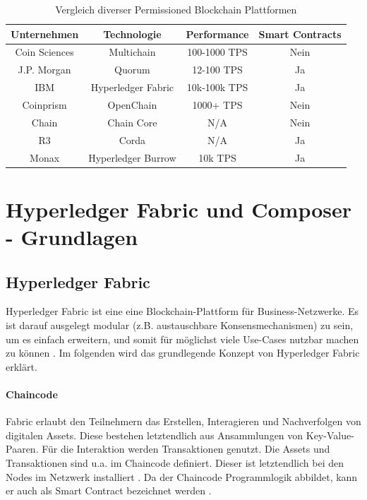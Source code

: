 \begin{table}[h]
    \centering
	\begin{tabular}{c c c c}
	\textbf{Unternehmen} & \textbf{Technologie}  & \textbf{Performance} & \textbf{Smart Contracts} \\ \hline
	Coin Sciences & Multichain & 100-1000 TPS & Nein \\ \hline
    J.P. Morgan & Quorum & 12-100 TPS & Ja \\ \hline
    IBM & Hyperledger Fabric & 10k-100k TPS & Ja \\ \hline
    Coinprism & OpenChain & 1000+ TPS & Nein \\ \hline
    Chain & Chain Core & N/A & Nein \\ \hline
    R3 & Corda & N/A & Ja \\ \hline
    Monax & Hyperledger Burrow & 10k TPS & Ja \\
    \end{tabular}
    \caption{Vergleich diverser Permissioned Blockchain Plattformen \cite{BenHamidaBlockchainEnterpriseOverview2017}\cite{HyperledgerBurrowTeamHyperledgerBurrowGitHub2018}}
	\label{tab:perm-comparison}
\end{table}


\section{Hyperledger Fabric und Composer - Grundlagen}
\label{sec:hyperledger-fabric-composer}


\subsection{Hyperledger Fabric}
Hyperledger Fabric ist eine eine Blockchain-Plattform für Business-Netzwerke. Es ist darauf ausgelegt modular (z.B. austauschbare Konsensmechanismen) zu sein, um es einfach erweitern, und somit für möglichst viele Use-Cases nutzbar machen zu können \cite{HyperledgerFabricTeamHyperledgerWhitepaper2016}. Im folgenden wird das grundlegende Konzept von Hyperledger Fabric erklärt.

\paragraph{Chaincode}
Fabric erlaubt den Teilnehmern das Erstellen, Interagieren und Nachverfolgen von digitalen Assets. Diese bestehen letztendlich aus Ansammlungen von Key-Value-Paaren. Für die Interaktion werden Transaktionen genutzt. Die Assets und Transaktionen sind u.a. im Chaincode definiert. Dieser ist letztendlich bei den Nodes im Netzwerk installiert \cite{SchererPerformanceScalabilityBlockchain2017}. Da der Chaincode Programmlogik abbildet, kann er auch als Smart Contract bezeichnet werden \cite{HyperledgerFabricTeamChaincodeHyperledgerFabric}.

